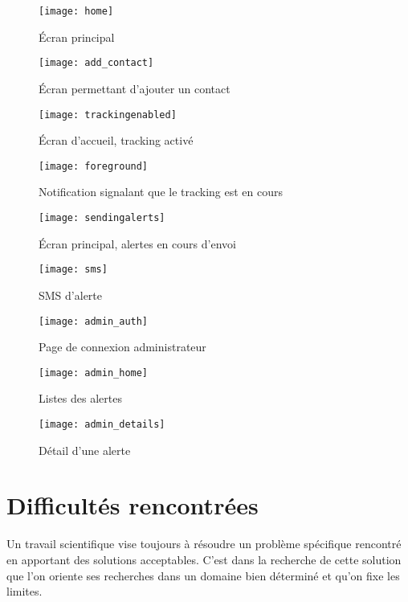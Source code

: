 \begin{figure}[H]
	\centering
	\texttt{[image: home]}
	\caption{Écran principal}
\end{figure}

\begin{figure}[H]
	\centering
	\texttt{[image: add\_contact]}
	\caption{Écran permettant d’ajouter un contact}
\end{figure}

\begin{figure}[H]
	\centering
	\texttt{[image: trackingenabled]}
	\caption{Écran d'accueil, tracking activé}
\end{figure}

\begin{figure}[H]
	\centering
	\texttt{[image: foreground]}
	\caption{Notification signalant que le tracking est en cours}
\end{figure}

\begin{figure}[H]
	\centering
	\texttt{[image: sendingalerts]}
	\caption{Écran principal, alertes en cours d’envoi}
\end{figure}

\begin{figure}[H]
	\centering
	\texttt{[image: sms]}
	\caption{SMS d’alerte}
\end{figure}

\begin{figure}[H]
	\centering
	\texttt{[image: admin\_auth]}
	\caption{Page de connexion administrateur}
\end{figure}

\begin{figure}[H]
	\centering
	\texttt{[image: admin\_home]}
	\caption{Listes des alertes}
\end{figure}

\begin{figure}[H]
	\centering
	\texttt{[image: admin\_details]}
	\caption{Détail d’une alerte}
\end{figure}

\section{Difficultés rencontrées}
Un travail scientifique vise toujours à résoudre un problème spécifique rencontré en apportant des solutions acceptables. C’est dans la recherche de cette solution que l’on oriente ses recherches dans un domaine bien déterminé et qu’on fixe les limites.

